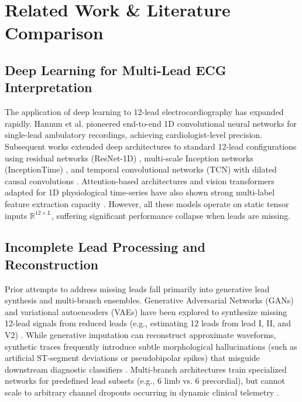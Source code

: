 \documentclass[journal,11pt,draftclsnofoot,onecolumn]{IEEEtran}
\begin{document}
\section{Related Work \& Literature Comparison}
\subsection{Deep Learning for Multi-Lead ECG Interpretation}
The application of deep learning to 12-lead electrocardiography has expanded rapidly. Hannun et al. \cite{ref_5} pioneered end-to-end 1D convolutional neural networks for single-lead ambulatory recordings, achieving cardiologist-level precision. Subsequent works extended deep architectures to standard 12-lead configurations using residual networks (ResNet-1D) \cite{ref_7,ref_9}, multi-scale Inception networks (InceptionTime) \cite{ref_23}, and temporal convolutional networks (TCN) with dilated causal convolutions \cite{ref_24}. Attention-based architectures and vision transformers adapted for 1D physiological time-series have also shown strong multi-label feature extraction capacity \cite{ref_8,ref_10}. However, all these models operate on static tensor inputs $\mathbb{R}^{12 \times L}$, suffering significant performance collapse when leads are missing.

\subsection{Incomplete Lead Processing and Reconstruction}
Prior attempts to address missing leads fall primarily into generative lead synthesis and multi-branch ensembles. Generative Adversarial Networks (GANs) and variational autoencoders (VAEs) have been explored to synthesize missing 12-lead signals from reduced leads (e.g., estimating 12 leads from lead I, II, and V2) \cite{ref_25,ref_26}. While generative imputation can reconstruct approximate waveforms, synthetic traces frequently introduce subtle morphological hallucinations (such as artificial ST-segment deviations or pseudobipolar spikes) that misguide downstream diagnostic classifiers \cite{ref_27}. Multi-branch architectures train specialized networks for predefined lead subsets (e.g., 6 limb vs. 6 precordial), but cannot scale to arbitrary channel dropouts occurring in dynamic clinical telemetry \cite{ref_28}.
\end{document}
